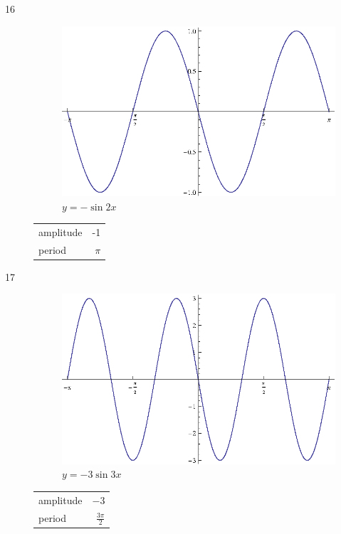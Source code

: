\documentclass{exam}
\begin{document}
\begin{description}
      \item[16]
        \begin{figure}[H]
          \centering
          \includegraphics[scale=0.9]{exercise16.eps}
          \caption{$y = - \sin 2x$}
        \end{figure}

        \begin{tabular}[H]{lr}
          \toprule
          amplitude & -1 \\
          period & $\pi$ \\
          \bottomrule
        \end{tabular}

      \item[17]
        \begin{figure}[H]
          \centering
          \includegraphics[scale=0.9]{exercise17.eps}
          \caption{$y = - 3 \sin 3x$}
        \end{figure}

        \begin{tabular}[H]{lr}
          \toprule
          amplitude & $-3$ \\
          period & $\frac{3 \pi}{2}$ \\
          \bottomrule
        \end{tabular}


\end{description}
\end{document}
